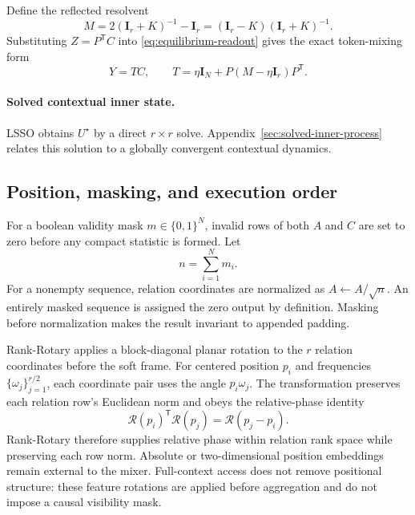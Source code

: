 \documentclass[10pt]{article}
\newcommand{\I}{\mathbf{I}}
\newcommand{\T}{\mathsf{T}}
\begin{document}
Define the reflected resolvent
\begin{equation}
    M = 2(\I_r+K)^{-1}-\I_r
      = (\I_r-K)(\I_r+K)^{-1}.
\label{eq:cayley}
\end{equation}
Substituting $Z=P^\T C$ into \eqref{eq:equilibrium-readout} gives the exact
token-mixing form
\begin{equation}
    Y=TC,\qquad
    T=\eta\I_N+P(M-\eta\I_r)P^\T.
\label{eq:token-mixer}
\end{equation}

\paragraph{Solved contextual inner state.}
LSSO obtains $U^\star$ by a direct $r\times r$ solve.
Appendix~\ref{sec:solved-inner-process} relates this solution to a globally
convergent contextual dynamics.

\subsection{Position, masking, and execution order}
\label{sec:mask-and-phase}

For a boolean validity mask $m\in\{0,1\}^N$, invalid rows of both $A$ and $C$
are set to zero before any compact statistic is formed.  Let
\begin{equation}
    n = \sum_{i=1}^N m_i.
\end{equation}
For a nonempty sequence, relation coordinates are normalized as
$A\leftarrow A/\sqrt{n}$.  An entirely masked sequence is assigned the zero
output by definition.  Masking before normalization makes the result invariant
to appended padding.

Rank-Rotary applies a block-diagonal planar rotation to
the $r$ relation coordinates before the soft frame.  For centered position
$p_i$ and frequencies $\{\omega_j\}_{j=1}^{r/2}$, each coordinate pair uses
the angle $p_i\omega_j$.  The transformation preserves each relation row's
Euclidean norm and obeys the relative-phase identity
\begin{equation}
    \mathcal R(p_i)^\T\mathcal R(p_j)=\mathcal R(p_j-p_i).
\label{eq:rank-rotary-relative}
\end{equation}
Rank-Rotary therefore supplies relative phase within relation rank space while
preserving each row norm.  Absolute or two-dimensional position embeddings
remain external to the mixer.  Full-context access does not remove positional
structure: these feature rotations are applied before aggregation and do not
impose a causal visibility mask.
\end{document}
